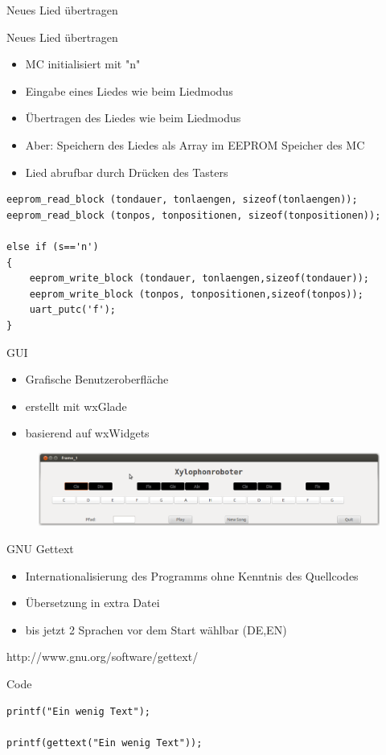 \begin{frame}[containsverbatim]{Neues Lied übertragen}
\begin{exampleblock}{Neues Lied übertragen}
\begin{itemize}
\item MC initialisiert mit "n"
\item Eingabe eines Liedes wie beim Liedmodus
\item Übertragen des Liedes wie beim Liedmodus
\item Aber: Speichern des Liedes als Array im EEPROM Speicher des MC
\item Lied abrufbar durch Drücken des Tasters
\end{itemize}
\end{exampleblock}
\begin{lstlisting}[tabsize=2, basicstyle=\ttfamily\scriptsize]
eeprom_read_block (tondauer, tonlaengen, sizeof(tonlaengen));
eeprom_read_block (tonpos, tonpositionen, sizeof(tonpositionen));
	
else if (s=='n')
{
	eeprom_write_block (tondauer, tonlaengen,sizeof(tondauer));
	eeprom_write_block (tonpos, tonpositionen,sizeof(tonpos));
	uart_putc('f');
}
\end{lstlisting}
\end{frame}

\begin{frame}{GUI}
\begin{itemize}
\item Grafische Benutzeroberfläche
\item erstellt mit wxGlade
\item basierend auf wxWidgets
\end{itemize}
\begin{figure}
\center
\includegraphics[trim=0cm 0cm 0cm 0cm, clip=true,width=\textwidth]{Plots/GUI.pdf}
\end{figure}
\end{frame}

\begin{frame}[containsverbatim]{GNU Gettext}
\begin{itemize}
\item Internationalisierung des Programms ohne Kenntnis des Quellcodes
\item Übersetzung in extra Datei
\item bis jetzt 2 Sprachen vor dem Start wählbar (DE,EN)
\end{itemize}
{\scriptsize http://www.gnu.org/software/gettext/}
\begin{exampleblock}{Code}
\begin{lstlisting}
printf("Ein wenig Text");

printf(gettext("Ein wenig Text"));
\end{lstlisting}
\end{exampleblock}
\end{frame}

